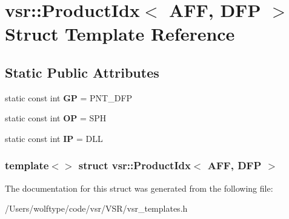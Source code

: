 \hypertarget{structvsr_1_1_product_idx_3_01_a_f_f_00_01_d_f_p_01_4}{\section{vsr\-:\-:Product\-Idx$<$ A\-F\-F, D\-F\-P $>$ Struct Template Reference}
\label{structvsr_1_1_product_idx_3_01_a_f_f_00_01_d_f_p_01_4}
}
\subsection*{Static Public Attributes}
\begin{DoxyCompactItemize}
\item 
\hypertarget{structvsr_1_1_product_idx_3_01_a_f_f_00_01_d_f_p_01_4_a2d81b56ffd0b18c190675ca691077553}{static const int {\bfseries G\-P} = P\-N\-T\-\_\-\-D\-F\-P}\label{structvsr_1_1_product_idx_3_01_a_f_f_00_01_d_f_p_01_4_a2d81b56ffd0b18c190675ca691077553}

\item 
\hypertarget{structvsr_1_1_product_idx_3_01_a_f_f_00_01_d_f_p_01_4_a95c1400eea5aca2164391dfd39a00512}{static const int {\bfseries O\-P} = S\-P\-H}\label{structvsr_1_1_product_idx_3_01_a_f_f_00_01_d_f_p_01_4_a95c1400eea5aca2164391dfd39a00512}

\item 
\hypertarget{structvsr_1_1_product_idx_3_01_a_f_f_00_01_d_f_p_01_4_a4b06f4364febdb0477f9740c15976e7b}{static const int {\bfseries I\-P} = D\-L\-L}\label{structvsr_1_1_product_idx_3_01_a_f_f_00_01_d_f_p_01_4_a4b06f4364febdb0477f9740c15976e7b}

\end{DoxyCompactItemize}
\subsubsection*{template$<$$>$ struct vsr\-::\-Product\-Idx$<$ A\-F\-F, D\-F\-P $>$}



The documentation for this struct was generated from the following file\-:\begin{DoxyCompactItemize}
\item 
/\-Users/wolftype/code/vsr/\-V\-S\-R/vsr\-\_\-templates.\-h\end{DoxyCompactItemize}
